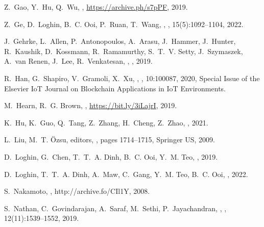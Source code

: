 \documentclass[11pt]{article}
\begin{document}
\begin{thebibliography}{10}
Z.~Gao, Y.~Hu,  Q.~Wu,
,
\newblock \url{https://archive.ph/s7pPF}, 2019.

Z.~Ge, D.~Loghin, B.~C. Ooi, P.~Ruan,  T.~Wang,
,
, 15(5):1092–1104, 2022.

J.~Gehrke, L.~Allen, P.~Antonopoulos, A.~Arasu, J.~Hammer, J.~Hunter,
  R.~Kaushik, D.~Kossmann, R.~Ramamurthy, S.~T.~V. Setty, J.~Szymaszek, A.~van
  Renen, J.~Lee,  R.~Venkatesan,
,
, 2019.

R.~Han, G.~Shapiro, V.~Gramoli,  X.~Xu,
,
, 10:100087, 2020,
\newblock Special Issue of the Elsevier IoT Journal on Blockchain Applications
  in IoT Environments.

M.~Hearn,  R.~G. Brown,
,
\newblock \url{https://bit.ly/3iLajrI}, 2019.

K.~Hu, K.~Guo, Q.~Tang, Z.~Zhang, H.~Cheng,  Z.~Zhao,
, 2021.

L.~Liu,  M.~T. {\"O}zsu, editors,
, pages 1714--1715,
\newblock Springer US, 2009.

D.~Loghin, G.~Chen, T.~T.~A. Dinh, B.~C. Ooi,  Y.~M. Teo,
, 2019.

D.~Loghin, T.~T.~A. Dinh, A.~Maw, C.~Gang, Y.~M. Teo,  B.~C. Ooi,
, 2022.

S.~Nakamoto,
,
\newblock http://archive.fo/CIl1Y, 2008.

S.~Nathan, C.~Govindarajan, A.~Saraf, M.~Sethi,  P.~Jayachandran,
,
, 12(11):1539–1552, 2019.


\end{thebibliography}
\end{document}

